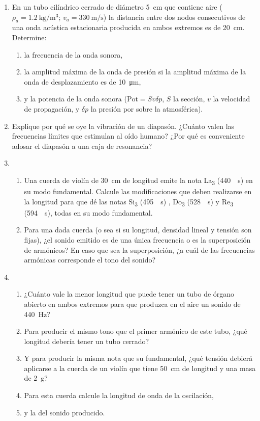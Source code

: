 \documentclass[11pt,spanish,a4paper]{article}
\begin{document}
\begin{enumerate}
\item En un tubo cilíndrico cerrado de diámetro \SI{5}{\centi\metre} que contiene aire (\(\rho_a = \SI{1.2}{\kilo\gram\per\metre\cubed}\); \(v_a = \SI{330}{\metre\per\second}\)) la distancia entre dos nodos consecutivos de una onda acústica estacionaria producida en ambos extremos es de \SI{20}{\centi\metre}.
	Determine:
    \begin{enumerate}
		\item la frecuencia de la onda sonora,
		\item la amplitud máxima de la onda de presión si la amplitud máxima de la onda de desplazamiento es de \SI{10}{\micro\metre},
		\item y la potencia de la onda sonora (\(\mathrm{Pot}= S v \delta p \), \(S\) la sección, \(v\) la velocidad de propagación, y \(\delta p\) la presión por sobre la atmosférica).
	\end{enumerate}


\item Explique por qué se oye la vibración de un diapasón.
	¿Cuánto valen las frecuencias límites que estimulan al oído humano?
	¿Por qué es conveniente adosar el diapasón a una caja de resonancia?


\item \begin{enumerate}
		\item Una cuerda de violín de \SI{30}{\centi\metre} de longitud emite la nota La\textsubscript{3} (\SI{440}{\per\second}) en su modo fundamental.
		Calcule las modificaciones que deben realizarse en la longitud para que dé las notas Si\textsubscript{3} (\SI{495}{\per\second}) , Do\textsubscript{3} (\SI{528}{\per\second}) y Re\textsubscript{3} (\SI{594}{\per\second}), todas en su modo fundamental.
		\item Para una dada cuerda (o sea si su longitud, densidad lineal y tensión son fijas), ¿el sonido emitido es de una única frecuencia o es la superposición de armónicos?
		En caso que sea la superposición, ¿a cuál de las frecuencias armónicas corresponde el tono del sonido? 
	\end{enumerate}


\item \begin{enumerate}
    	\item \label{13a} ¿Cuánto vale la menor longitud que puede tener un tubo de órgano abierto en ambos extremos para que produzca en el aire un sonido de \SI{440}{\hertz}?
		\item Para producir el mismo tono que el primer armónico de este tubo, ¿qué longitud debería tener un tubo cerrado?
		\item Y para producir la misma nota que su fundamental, ¿qué tensión debierá aplicarse a la cuerda de un violín que tiene \SI{50}{\centi\metre} de longitud y una masa de \SI{2}{g}?
		\item Para esta cuerda calcule la longitud de onda de la oscilación, 
		\item y la del sonido producido.
	\end{enumerate}


\end{enumerate}
\end{document}

